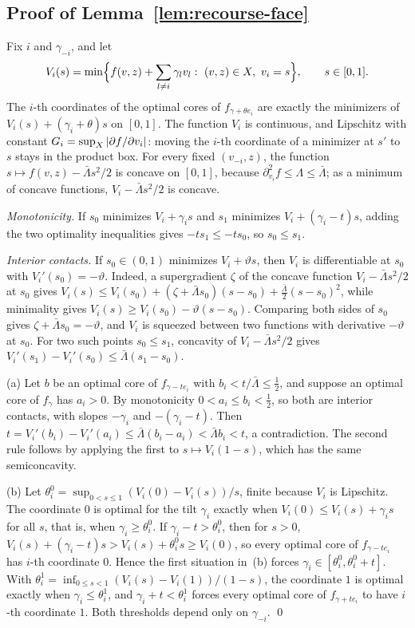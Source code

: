 \subsection{Proof of Lemma~\ref{lem:recourse-face}}
\label{app:recourse-face}

Fix $i$ and $\gamma_{-i}$, and let
\[
 V_i(s)=\min\Bigl\{f(v,z)+\sum_{l\ne i}\gamma_lv_l:\ (v,z)\in X,\ v_i=s\Bigr\},
 \qquad s\in[0,1].
\]
The $i$-th coordinates of the optimal cores of $f_{\gamma+\theta e_i}$
are exactly the minimizers of $V_i(s)+(\gamma_i+\theta)s$ on $[0,1]$. The
function $V_i$ is continuous, and Lipschitz with constant
$G_i=\sup_X\left\lvert\partial f/\partial v_i\right\rvert$: moving the $i$-th coordinate
of a minimizer at $s'$ to $s$ stays in the product box. For every fixed
$(v_{-i},z)$, the function $s\mapsto f(v,z)-\bar\Lambda s^2/2$ is concave
on $[0,1]$, because $\partial_{v_i}^2f\le\Lambda\le\bar\Lambda$; as a
minimum of concave functions, $V_i-\bar\Lambda s^2/2$ is concave.

\emph{Monotonicity.} If $s_0$ minimizes $V_i+\gamma_is$ and $s_1$
minimizes $V_i+(\gamma_i-t)s$, adding the two optimality inequalities
gives $-ts_1\le-ts_0$, so $s_0\le s_1$.

\emph{Interior contacts.} If $s_0\in(0,1)$ minimizes $V_i+\vartheta s$,
then $V_i$ is differentiable at $s_0$ with $V_i'(s_0)=-\vartheta$.
Indeed, a supergradient $\zeta$ of the concave function
$V_i-\bar\Lambda s^2/2$ at $s_0$ gives
$V_i(s)\le V_i(s_0)+(\zeta+\bar\Lambda s_0)(s-s_0)+\frac{\bar\Lambda}2(s-s_0)^2$,
while minimality gives $V_i(s)\ge V_i(s_0)-\vartheta(s-s_0)$. Comparing
both sides of $s_0$ gives $\zeta+\bar\Lambda s_0=-\vartheta$, and $V_i$ is
squeezed between two functions with derivative $-\vartheta$ at $s_0$.
For two such points $s_0\le s_1$, concavity of $V_i-\bar\Lambda s^2/2$
gives $V_i'(s_1)-V_i'(s_0)\le\bar\Lambda(s_1-s_0)$.

(a) Let $b$ be an optimal core of $f_{\gamma-te_i}$ with
$b_i<t/\bar\Lambda\le\frac12$, and suppose an optimal core of $f_\gamma$
has $a_i>0$. By monotonicity $0<a_i\le b_i<\frac12$, so both are
interior contacts, with slopes $-\gamma_i$ and $-(\gamma_i-t)$. Then
$t=V_i'(b_i)-V_i'(a_i)\le\bar\Lambda(b_i-a_i)<\bar\Lambda b_i<t$, a
contradiction. The second rule follows by applying the first to
$s\mapsto V_i(1-s)$, which has the same semiconcavity.

(b) Let $\theta_i^0=\sup_{0<s\le1}(V_i(0)-V_i(s))/s$, finite because
$V_i$ is Lipschitz. The coordinate $0$ is optimal for the tilt
$\gamma_i$ exactly when $V_i(0)\le V_i(s)+\gamma_is$ for all $s$, that
is, when $\gamma_i\ge\theta_i^0$. If $\gamma_i-t>\theta_i^0$, then for
$s>0$, $V_i(s)+(\gamma_i-t)s>V_i(s)+\theta_i^0s\ge V_i(0)$, so every
optimal core of $f_{\gamma-te_i}$ has $i$-th coordinate $0$. Hence the
first situation in~(b) forces $\gamma_i\in[\theta_i^0,\theta_i^0+t]$.
With $\theta_i^1=\inf_{0\le s<1}(V_i(s)-V_i(1))/(1-s)$, the coordinate
$1$ is optimal exactly when $\gamma_i\le\theta_i^1$, and
$\gamma_i+t<\theta_i^1$ forces every optimal core of $f_{\gamma+te_i}$ to
have $i$-th coordinate $1$. Both thresholds depend only on
$\gamma_{-i}$. \qed

